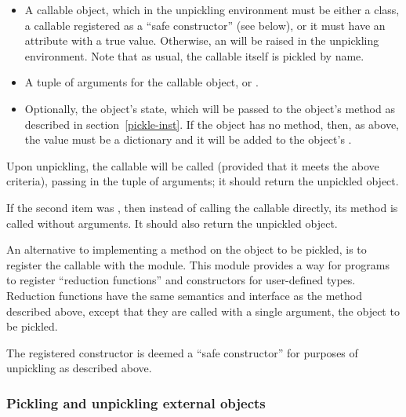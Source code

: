 \begin{itemize}

\item A callable object, which in the unpickling environment must be
      either a class, a callable registered as a ``safe constructor''
      (see below), or it must have an attribute
       with a true value.  Otherwise,
      an  will be raised in the unpickling
      environment.  Note that as usual, the callable itself is pickled
      by name.

\item A tuple of arguments for the callable object, or .

\item Optionally, the object's state, which will be passed to
      the object's  method as described in
      section~\ref{pickle-inst}.  If the object has no
       method, then, as above, the value must
      be a dictionary and it will be added to the object's
      .

\end{itemize}

Upon unpickling, the callable will be called (provided that it meets
the above criteria), passing in the tuple of arguments; it should
return the unpickled object.

If the second item was , then instead of calling the
callable directly, its  method is called
without arguments.  It should also return the unpickled object.


An alternative to implementing a  method on the
object to be pickled, is to register the callable with the
 module.  This module provides a way
for programs to register ``reduction functions'' and constructors for
user-defined types.   Reduction functions have the same semantics and
interface as the  method described above, except
that they are called with a single argument, the object to be pickled.

The registered constructor is deemed a ``safe constructor'' for purposes
of unpickling as described above.

\subsubsection{Pickling and unpickling external objects}


